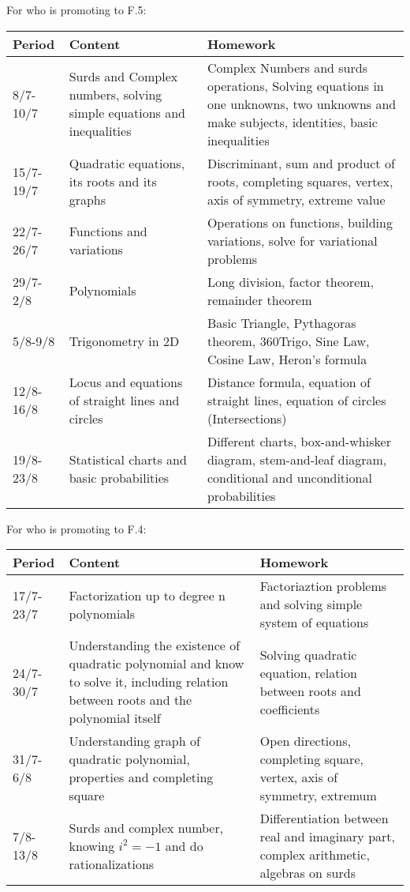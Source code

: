 \documentclass{article}
\begin{document}
    For who is promoting to F.5:
    \begin{center}
        \begin{tabular}{|m{2cm}|m{6cm}|m{6cm}|}
            \hline
            Period&Content&Homework\\
            \hline
            8/7-10/7&Surds and Complex numbers, solving simple equations and inequalities&Complex Numbers and surds operations, Solving equations in one unknowns, two unknowns and make subjects, identities, basic inequalities\\
            \hline
            15/7-19/7&Quadratic equations, its roots and its graphs&Discriminant, sum and product of roots, completing squares, vertex, axis of symmetry, extreme value\\
            \hline
            22/7-26/7&Functions and variations&Operations on functions, building variations, solve for variational problems\\
            \hline
            29/7-2/8&Polynomials&Long division, factor theorem, remainder theorem\\
            \hline
            5/8-9/8&Trigonometry in 2D&Basic Triangle, Pythagoras theorem, 360Trigo, Sine Law, Cosine Law, Heron's formula\\
            \hline
            12/8-16/8&Locus and equations of straight lines and circles&Distance formula, equation of straight lines, equation of circles (Intersections)\\
            \hline
            19/8-23/8&Statistical charts and basic probabilities& Different charts, box-and-whisker diagram, stem-and-leaf diagram, conditional and unconditional probabilities\\
            \hline
        \end{tabular}
    \end{center}

    For who is promoting to F.4:
    \begin{center}
        \begin{tabular}{|m{2cm}|m{6cm}|m{6cm}|}
            \hline
            Period&Content&Homework\\
            \hline
            17/7-23/7&Factorization up to degree n polynomials&Factoriaztion problems and solving simple system of equations\\
            \hline
            24/7-30/7&Understanding the existence of quadratic polynomial and know to solve it, including relation between roots and the polynomial itself& Solving quadratic equation, relation between roots and coefficients\\
            \hline
            31/7-6/8&Understanding graph of quadratic polynomial, properties and completing square&Open directions, completing square, vertex, axis of symmetry, extremum\\
            \hline
            7/8-13/8&Surds and complex number, knowing $i^2=-1$ and do rationalizations&Differentiation between real and imaginary part, complex arithmetic, algebras on surds\\
            \hline
        \end{tabular}
    \end{center}
\end{document}
